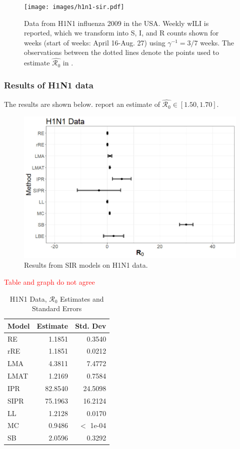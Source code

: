 \documentclass[12pt]{article}
\newcommand{\com}[1]{\textcolor{red}{ #1}}
\newcommand{\rr}{\ensuremath{\mathcal{R}_0}}
\begin{document}
\begin{figure}[H]
  \centering
  \texttt{[image: images/h1n1-sir.pdf]}
  \caption{Data from H1N1 influenza 2009 in the USA.  Weekly wILI is reported, which we transform into S, I, and R counts shown for weeks (start of weeks: April 16-Aug. 27)  using $\gamma^{-1} = 3/7$ weeks.  The observations between the dotted lines denote the points used to estimate $\hat{\rr}$ in \cite{towers2009}.}
  \end{figure}
      

      \subsubsection{Results of H1N1 data}
      The results are shown below.  \cite{towers2009} report an estimate of $\hat{\rr} \in [1.50, 1.70]$.

\begin{figure}[H]
	\centering
	\includegraphics[width=\textwidth]{images/h1n1.jpg}
	\caption{Results from SIR models on H1N1 data.}
\end{figure}

\com{Table and graph do not agree}
\begin{table}[H]
	
	
	\centering
	\begin{tabular}{l|r|r}
		\hline
		Model & Estimate & Std. Dev\\
		\hline
		RE & 1.1851 & 0.3540\\
		\hline
		rRE & 1.1851 & 0.0212\\
		\hline
		LMA & 4.3811 & 7.4772\\
		\hline
		LMAT & 1.2169 & 0.7584\\
		\hline
		IPR & 82.8540 & 24.5098\\
		\hline
		SIPR & 75.1963 & 16.2124\\
		\hline
		LL & 1.2128 & 0.0170\\
		\hline
		MC & 0.9486 & $<$ 1e-04 \\
		\hline
		SB & 2.0596 & 0.3292\\
		\hline
	\end{tabular}
	\caption{H1N1 Data, $\rr$ Estimates and Standard Errors}
\end{table}
\end{document}
